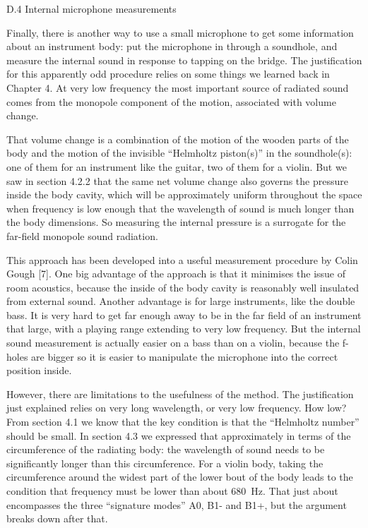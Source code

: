   D.4 Internal microphone measurements 

  Finally, there is another way to use a small microphone to get some 
  information about an instrument body: put the microphone in through a 
  soundhole, and measure the internal sound in response to tapping on the 
  bridge. The justification for this apparently odd procedure relies on some 
  things we learned back in Chapter 4. At very low frequency the most important 
  source of radiated sound comes from the monopole component of the motion, 
  associated with volume change. 

  That volume change is a combination of the motion of the wooden parts of the 
  body and the motion of the invisible “Helmholtz piston(s)” in the 
  soundhole(s): one of them for an instrument like the guitar, two of them for 
  a violin. But we saw in section 4.2.2 that the same net volume change also 
  governs the pressure inside the body cavity, which will be approximately 
  uniform throughout the space when frequency is low enough that the wavelength 
  of sound is much longer than the body dimensions. So measuring the internal 
  pressure is a surrogate for the far-field monopole sound radiation. 

  This approach has been developed into a useful measurement procedure by Colin 
  Gough [7]. One big advantage of the approach is that it minimises the issue 
  of room acoustics, because the inside of the body cavity is reasonably well 
  insulated from external sound. Another advantage is for large instruments, 
  like the double bass. It is very hard to get far enough away to be in the far 
  field of an instrument that large, with a playing range extending to very low 
  frequency. But the internal sound measurement is actually easier on a bass 
  than on a violin, because the f-holes are bigger so it is easier to 
  manipulate the microphone into the correct position inside. 

  However, there are limitations to the usefulness of the method. The 
  justification just explained relies on very long wavelength, or very low 
  frequency. How low? From section 4.1 we know that the key condition is that 
  the “Helmholtz number” should be small. In section 4.3 we expressed that 
  approximately in terms of the circumference of the radiating body: the 
  wavelength of sound needs to be significantly longer than this circumference. 
  For a violin body, taking the circumference around the widest part of the 
  lower bout of the body leads to the condition that frequency must be lower 
  than about 680~Hz. That just about encompasses the three “signature modes” 
  A0, B1- and B1+, but the argument breaks down after that. 

